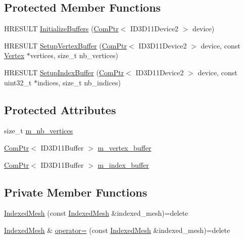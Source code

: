 \subsection*{Protected Member Functions}
\begin{DoxyCompactItemize}
\item 
H\+R\+E\+S\+U\+LT \hyperlink{classmage_1_1_indexed_mesh_a164cc8bcbf150f5bb7a26039f684d062}{Initialize\+Buffers} (\hyperlink{namespacemage_ae74f374780900893caa5555d1031fd79}{Com\+Ptr}$<$ I\+D3\+D11\+Device2 $>$ device)
\item 
H\+R\+E\+S\+U\+LT \hyperlink{classmage_1_1_indexed_mesh_a6364a567e699a2afbeeb3324739cf003}{Setup\+Vertex\+Buffer} (\hyperlink{namespacemage_ae74f374780900893caa5555d1031fd79}{Com\+Ptr}$<$ I\+D3\+D11\+Device2 $>$ device, const \hyperlink{structmage_1_1_vertex}{Vertex} $\ast$vertices, size\+\_\+t nb\+\_\+vertices)
\item 
H\+R\+E\+S\+U\+LT \hyperlink{classmage_1_1_indexed_mesh_abf1d1c81af08168b548ef638e66e8796}{Setup\+Index\+Buffer} (\hyperlink{namespacemage_ae74f374780900893caa5555d1031fd79}{Com\+Ptr}$<$ I\+D3\+D11\+Device2 $>$ device, const uint32\+\_\+t $\ast$indices, size\+\_\+t nb\+\_\+indices)
\end{DoxyCompactItemize}
\subsection*{Protected Attributes}
\begin{DoxyCompactItemize}
\item 
size\+\_\+t \hyperlink{classmage_1_1_indexed_mesh_aa97d660f00cdec3c99b50ea636d49709}{m\+\_\+nb\+\_\+vertices}
\item 
\hyperlink{namespacemage_ae74f374780900893caa5555d1031fd79}{Com\+Ptr}$<$ I\+D3\+D11\+Buffer $>$ \hyperlink{classmage_1_1_indexed_mesh_a306c078e64be74e67ca302ac816899cd}{m\+\_\+vertex\+\_\+buffer}
\item 
\hyperlink{namespacemage_ae74f374780900893caa5555d1031fd79}{Com\+Ptr}$<$ I\+D3\+D11\+Buffer $>$ \hyperlink{classmage_1_1_indexed_mesh_ad8986e3f875a098c3b6d577dd53125e7}{m\+\_\+index\+\_\+buffer}
\end{DoxyCompactItemize}
\subsection*{Private Member Functions}
\begin{DoxyCompactItemize}
\item 
\hyperlink{classmage_1_1_indexed_mesh_a4915cb34541278e14cfd854e6d4b450e}{Indexed\+Mesh} (const \hyperlink{classmage_1_1_indexed_mesh}{Indexed\+Mesh} \&indexed\+\_\+mesh)=delete
\item 
\hyperlink{classmage_1_1_indexed_mesh}{Indexed\+Mesh} \& \hyperlink{classmage_1_1_indexed_mesh_ab15d5ff1ddd76fda2654f87ef611e1f6}{operator=} (const \hyperlink{classmage_1_1_indexed_mesh}{Indexed\+Mesh} \&indexed\+\_\+mesh)=delete
\end{DoxyCompactItemize}



